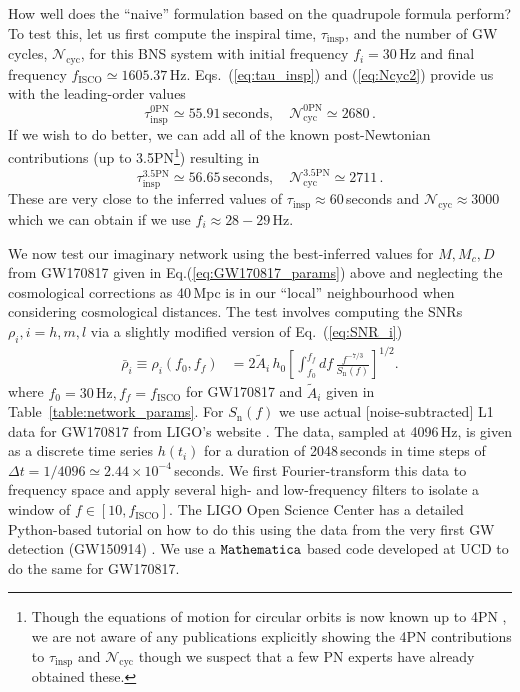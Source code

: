 \documentclass[amsmath,amssymb,aps,floats,amsfonts,notitlepage,superscriptaddress,eqsecnum,nofootinbib,10pt]{revtex4-1}
\newcommand{\f}{\frac}
\newcommand{\be}{\begin{equation}}
\newcommand{\ee}{\end{equation}}
\begin{document}
How well does the ``naive'' formulation based on the quadrupole formula perform? 
To test this, let us first compute the inspiral time, $\tau_\text{insp}$, and the number of GW cycles, $\mathcal{N}_\text{cyc}$, for this BNS system with initial frequency $f_i=30\,$Hz and final frequency $f_\text{ISCO} \simeq 1605.37\,$Hz. 
Eqs.~(\ref{eq:tau_insp}) and (\ref{eq:Ncyc2}) provide us with the leading-order values
%
\be
\tau_\text{insp}^{0\text{PN}} \simeq 55.91\,\text{seconds}, \quad \mathcal{N}_\text{cyc}^{0\text{PN}} \simeq 2680\,\label{eq:GW170817_values_0PN}. 
\ee
%
If we wish to do better, we can add all of the known post-Newtonian contributions 
(up to 3.5PN\footnote{Though the equations of motion for circular orbits is now known up to 4PN \cite{4PN_EoM_paper}, we are not aware of any publications
explicitly showing the 4PN contributions to $\tau_\text{insp}$ and $\mathcal{N}_\text{cyc}$ though we suspect that a few PN experts have already obtained these.}) resulting in
%
\be
\tau_\text{insp}^{3.5\text{PN}} \simeq 56.65\,\text{seconds}, \quad \mathcal{N}_\text{cyc}^{3.5\text{PN}} \simeq 2711 \label{eq:GW170817_values_3p5PN}\, .
\ee
%
These are very close to the inferred values of $\tau_\text{insp}\approx 60$\,seconds and $\mathcal{N}_\text{cyc} \approx 3000$ which we can obtain if we use $f_i \approx 28-29\,$Hz.

We now test our imaginary network using the best-inferred values for $M,M_c,D$ from GW170817 given in Eq.(\ref{eq:GW170817_params}) above and 
neglecting the cosmological corrections as 40\,Mpc is in our ``local'' neighbourhood when considering cosmological distances.
The test involves computing the SNRs $\rho_i, i=h,m,l$ via a slightly modified version of Eq.~(\ref{eq:SNR_i})
%
\begin{align}
\bar{\rho}_i\equiv\rho_i(f_0,f_f) &= 2\tilde{A}_i\, h_0\left[ \int_{f_0}^{f_f} df\, \f{f^{-7/3}}{S_\text{n}(f)}\right]^{1/2} \label{eq:SNR_i_with_fi}.
\end{align}
%
where $f_0 =30\,\text{Hz}, f_f= f_\text{ISCO}$ for GW170817 and $\tilde{A}_i$ given in Table~\ref{table:network_params}.
For $S_\text{n}(f)$ we use actual [noise-subtracted] L1 data for GW170817 from LIGO's website \cite{LIGO_L1_data}.
The data, sampled at 4096\,Hz, is given as a discrete time series $h(t_i)$ for a duration of 2048\,seconds in time steps of $\Delta t=1/4096\simeq 2.44\times 10^{-4}\,$seconds.
We first Fourier-transform this data to frequency space and apply several high- and low-frequency filters to isolate a window of $f\in [10, f_\text{ISCO}]$.
The LIGO Open Science Center has a detailed Python-based tutorial on how to do this using the data from the very first GW detection (GW150914) \cite{LIGO_tutorial}. 
We use a $\verb|Mathematica|$ based code developed at UCD to do the same for GW170817.
\end{document}
